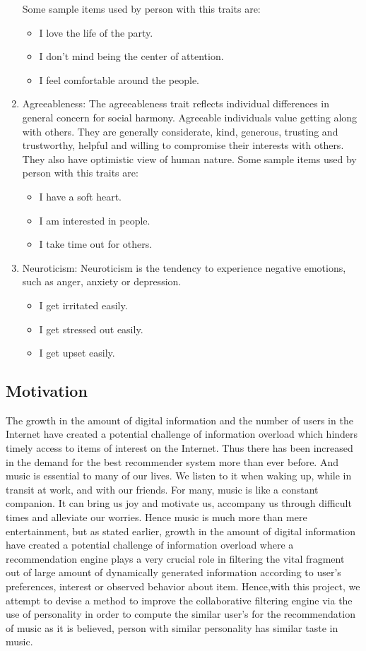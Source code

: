 \begin{enumerate}
Some sample items used by person with this traits are:
\begin{itemize}
	\item I love the life of the party.
	\item I don't mind being the center of attention.
	\item I feel comfortable around the people.
\end{itemize}
\item Agreeableness: The agreeableness trait reflects individual differences in general concern for social harmony. Agreeable individuals value getting along with others. They are generally considerate, kind, generous, trusting and trustworthy, helpful and willing to compromise their interests with others. They also have optimistic view of human nature.
Some sample items used by person with this traits are:
\begin{itemize}
	\item I have a soft heart.
	\item I am interested in people.
	\item I take time out for others.
\end{itemize}
\item Neuroticism: Neuroticism is the tendency to experience negative emotions, such as anger, anxiety or depression.
\begin{itemize}
	\item I get irritated easily.
	\item I get stressed out easily.
	\item I get upset easily.
\end{itemize}
\end{enumerate}
\subsection{Motivation}
The growth in the amount of digital information and the number of users in the Internet have created a potential challenge of information overload which hinders timely access to items of interest on the Internet. Thus there has been increased in the demand for the best recommender system more than ever before. And music is essential to many of our lives. We listen to it when waking up, while in transit at work, and with our friends. For many, music is like a constant companion. It can bring us joy and motivate us, accompany us through difficult times and alleviate our worries. Hence music is much more than mere entertainment, but as stated earlier, growth in the amount of digital information have created a potential challenge of information overload where a recommendation engine plays a very crucial role in filtering the vital fragment out of large amount of dynamically generated information according to user's preferences, interest or observed behavior about item.
Hence,with this project, we attempt to devise a method to improve the collaborative filtering engine via the use of personality in order to compute the similar user's for the recommendation of music as it is believed, person with similar personality has similar taste in music.

